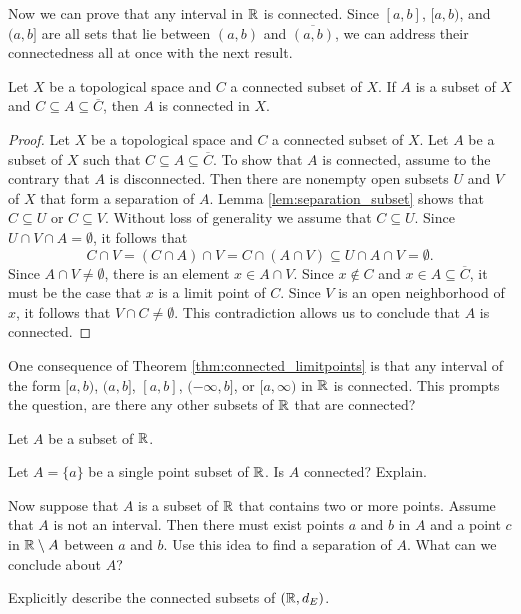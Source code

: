 Now we can prove that any interval in $\mathbb{R}$ is connected. Since $[a,b]$, $[a,b)$, and $(a,b]$ are all sets that lie between $(a,b)$ and $\overline{(a,b)}$, we can address their connectedness all at once with the next result. 

\begin{theorem} \label{thm:connected_limitpoints} Let $X$ be a topological space and $C$ a connected subset of $X$. If $A$ is a subset of $X$ and $C \subseteq A \subseteq \overline{C}$, then $A$ is connected in $X$. 
\end{theorem}

\begin{proof} Let $X$ be a topological space and $C$ a connected subset of $X$. Let $A$ be a subset of $X$ such that $C \subseteq A \subseteq \overline{C}$. To show that $A$ is connected, assume to the contrary that $A$ is disconnected. Then there are nonempty open subsets $U$ and $V$ of $X$ that form a separation of $A$. Lemma \ref{lem:separation_subset} shows that $C \subseteq U$ or $C \subseteq V$.  Without loss of generality we assume that $C \subseteq U$. Since $U \cap V \cap A = \emptyset$, it follows that 
\[C \cap V = (C \cap A) \cap V = C \cap (A \cap V)  \subseteq U \cap A \cap V = \emptyset.\]
Since $A \cap V \neq \emptyset$, there is an element $x \in A \cap V$.  Since $x \notin C$ and $x \in A \subseteq \overline{C}$, it must be the case that $x$ is a limit point of $C$. Since $V$ is an open neighborhood of $x$, it follows that $V \cap C \neq \emptyset$. This contradiction allows us to conclude that $A$ is connected. 
\end{proof}



One consequence of Theorem \ref{thm:connected_limitpoints} is that any interval of the form $[a,b)$, $(a,b]$, $[a,b]$, $(-\infty, b]$, or $[a, \infty)$ in $\mathbb{R}$ is connected. This prompts the question, are there any other subsets of $\mathbb{R}$ that are connected? 


\begin{activity} \label{act:connected_subsets_R}  Let $A$ be a subset of $\mathbb{R}$. 
\ba
\item Let $A = \{a\}$ be a single point subset of $\mathbb{R}$. Is $A$ connected? Explain.

\item Now suppose that $A$ is a subset of $\mathbb{R}$ that contains two or more points. Assume that $A$ is not an interval. Then there must exist points $a$ and $b$ in $A$ and a point $c$ in $\mathbb{R} \setminus A$ between $a$ and $b$. Use this idea to find a separation of $A$. What can we conclude about $A$? 

\item Explicitly describe the connected subsets of $(\mathbb{R}, d_E)$. 

\ea

\end{activity}


